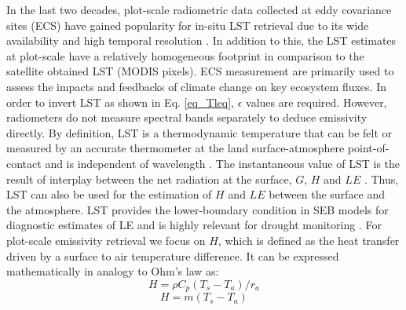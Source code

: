 \documentclass[fleqn,10pt]{wlscirep}
\begin{document}
In the last two decades, plot-scale radiometric data collected at eddy covariance sites (ECS) have gained popularity for in-situ LST retrieval due to its wide availability and high temporal resolution \cite{stoy2013data,cullen2007energy}. In addition to this, the LST estimates at plot-scale have a relatively homogeneous footprint in comparison to the satellite obtained LST (MODIS pixels). ECS measurement are primarily used to assess the impacts and feedbacks of climate change on key ecosystem fluxes\cite{baldocchi2001fluxnet}. In order to invert LST as shown in Eq. \eqref{eq_Tleq}, $\epsilon$ values are required. However, radiometers do not measure spectral bands separately to deduce emissivity directly.
By definition, LST is a thermodynamic temperature that can be felt or measured by an accurate thermometer at the land surface-atmosphere point-of-contact and is independent of wavelength \cite{guillevic2017land}. The instantaneous value of LST is the result of interplay between the net radiation at the surface, $G$, $H$ and $LE$ \cite{wang_global_2013-2}. Thus, LST can also be used for the estimation of $H$ \cite{sun1995relationship} and $LE$ \cite{jacob2001comprehensive} between the surface and the atmosphere. LST provides the lower-boundary condition in SEB models for diagnostic estimates of LE  and is highly relevant for drought monitoring \cite{trebs2021role,mallick2016canopy,mallick2015reintroducing}. For plot-scale emissivity retrieval we focus on $H$, which is defined as the heat transfer driven by a surface to air temperature difference. It can be expressed mathematically in analogy to Ohm's law as:
\begin{equation}\label{eq_H1}
H= \rho C_{p}(T_{s} - T_{a})/r_{a}
\end{equation}
\begin{equation}\label{eq_H}
H= m(T_{s} - T_{a})
\end{equation}
\end{document}
